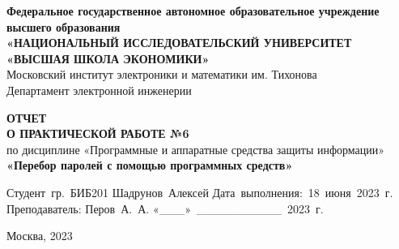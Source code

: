 
\begin{titlepage}
    \begin{center}

        \timesfont
        {\large\bf\timesfont Федеральное‌ ‌государственное‌ ‌автономное‌ ‌образовательное‌ ‌учреждение‌ ‌высшего‌ образования\\}
        {\large\bf\timesfont «НАЦИОНАЛЬНЫЙ‌ ‌ИССЛЕДОВАТЕЛЬСКИЙ‌ ‌УНИВЕРСИТЕТ‌ «ВЫСШАЯ‌ ‌ШКОЛА‌ ‌ЭКОНОМИКИ»‌\\}
        Московский‌ ‌институт‌ ‌электроники‌ ‌и‌ ‌математики‌ ‌им. Тихонова‌\\
        Департамент‌ ‌электронной‌ ‌инженерии‌\\

        \vfill
        \vfill

        {\bf\timesfont ОТЧЕТ \\
            О ПРАКТИЧЕСКОЙ РАБОТЕ №6} \\
        по дисциплине «Программные и аппаратные средства защиты информации» \\
        {\bf\timesfont «Перебор паролей с помощью программных средств»} \\


        \vfill
        \vfill
        \vfill

        \hfill\vbox
        {
            \hbox{Студент гр. БИБ201}
            \hbox{Шадрунов Алексей}
            \hbox{Дата выполнения: 18 июня 2023 г.}
            \hbox{}
            \hbox{Преподаватель:}
            \hbox{Перов А. А.}
            \hbox{«\_\_\_» \_\_\_\_\_\_\_\_\_\_ 2023 г.}
        }

        \vfill

        Москва, 2023
    \end{center}
\end{titlepage}
